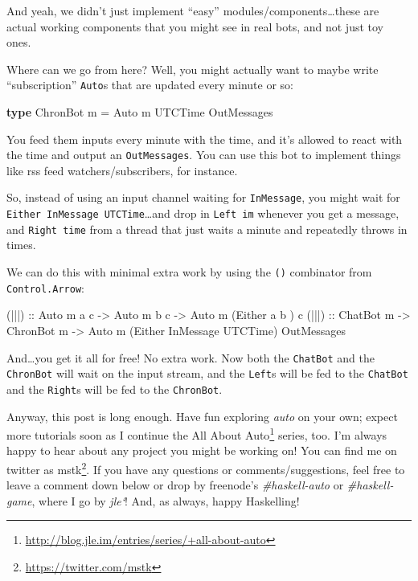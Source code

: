 \documentclass[]{article}
\newenvironment{Shaded}{}{}
\newcommand{\KeywordTok}[1]{\textcolor[rgb]{0.00,0.44,0.13}{\textbf{#1}}}
\newcommand{\DataTypeTok}[1]{\textcolor[rgb]{0.56,0.13,0.00}{#1}}
\newcommand{\OtherTok}[1]{\textcolor[rgb]{0.00,0.44,0.13}{#1}}
\newcommand{\FunctionTok}[1]{\textcolor[rgb]{0.02,0.16,0.49}{#1}}
\newcommand{\NormalTok}[1]{#1}
\renewcommand{\href}[2]{#2\footnote{\url{#1}}}
\begin{document}
And yeah, we didn't just implement ``easy'' modules/components\ldots{}these are
actual working components that you might see in real bots, and not just toy
ones.

Where can we go from here? Well, you might actually want to maybe write
``subscription'' \texttt{Auto}s that are updated every minute or so:

\begin{Shaded}
\begin{Highlighting}[]
\KeywordTok{type} \DataTypeTok{ChronBot}\NormalTok{ m }\FunctionTok{=} \DataTypeTok{Auto}\NormalTok{ m }\DataTypeTok{UTCTime} \DataTypeTok{OutMessages}
\end{Highlighting}
\end{Shaded}

You feed them inputs every minute with the time, and it's allowed to react with
the time and output an \texttt{OutMessages}. You can use this bot to implement
things like rss feed watchers/subscribers, for instance.

So, instead of using an input channel waiting for \texttt{InMessage}, you might
wait for \texttt{Either\ InMessage\ UTCTime}\ldots{}and drop in
\texttt{Left\ im} whenever you get a message, and \texttt{Right\ time} from a
thread that just waits a minute and repeatedly throws in times.

We can do this with minimal extra work by using the
\texttt{(\textbar{}\textbar{}\textbar{})} combinator from
\texttt{Control.Arrow}:

\begin{Shaded}
\begin{Highlighting}[]
\OtherTok{(|||) ::} \DataTypeTok{Auto}\NormalTok{ m a c }\OtherTok{->} \DataTypeTok{Auto}\NormalTok{ m b c }\OtherTok{->} \DataTypeTok{Auto}\NormalTok{ m (}\DataTypeTok{Either}\NormalTok{ a         b      ) c}
\OtherTok{(|||) ::} \DataTypeTok{ChatBot}\NormalTok{ m  }\OtherTok{->} \DataTypeTok{ChronBot}\NormalTok{ m }\OtherTok{->} \DataTypeTok{Auto}\NormalTok{ m (}\DataTypeTok{Either} \DataTypeTok{InMessage} \DataTypeTok{UTCTime}\NormalTok{) }\DataTypeTok{OutMessages}
\end{Highlighting}
\end{Shaded}

And\ldots{}you get it all for free! No extra work. Now both the \texttt{ChatBot}
and the \texttt{ChronBot} will wait on the input stream, and the \texttt{Left}s
will be fed to the \texttt{ChatBot} and the \texttt{Right}s will be fed to the
\texttt{ChronBot}.

Anyway, this post is long enough. Have fun exploring \emph{auto} on your own;
expect more tutorials soon as I continue the
\href{http://blog.jle.im/entries/series/+all-about-auto}{All About Auto} series,
too. I'm always happy to hear about any project you might be working on! You can
find me on twitter as \href{https://twitter.com/mstk}{mstk}. If you have any
questions or comments/suggestions, feel free to leave a comment down below or
drop by freenode's \emph{\#haskell-auto} or \emph{\#haskell-game}, where I go by
\emph{jle`}! And, as always, happy Haskelling!
\end{document}
